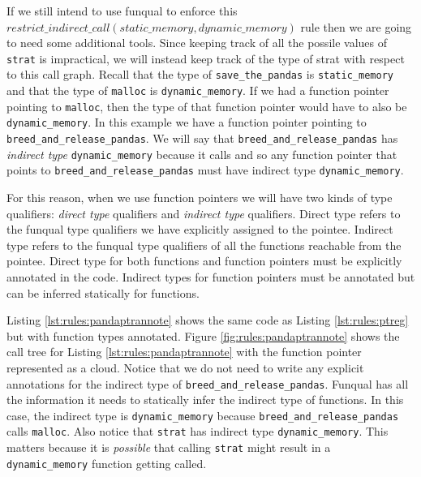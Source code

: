 \begin{sloppypar}
If we still intend to use funqual to enforce this $restrict\_indirect\_call(static\_memory, dynamic\_memory)$ rule then we are going to need some additional tools.  Since keeping track of all the possile values of \lstinline{strat} is impractical, we will instead keep track of the type of strat with respect to this call graph.  Recall that the type of \lstinline{save_the_pandas} is \lstinline{static_memory} and that the type of \lstinline{malloc} is \lstinline{dynamic_memory}.  If we had a function pointer pointing to \lstinline{malloc}, then the type of that function pointer would have to also be \lstinline{dynamic_memory}.  In this example we have a function pointer pointing to \lstinline{breed_and_release_pandas}.  We will say that \lstinline{breed_and_release_pandas} has \textit{indirect type} \lstinline{dynamic_memory} because it calls  and so any function pointer that points to \lstinline{breed_and_release_pandas} must have indirect type \lstinline{dynamic_memory}.
\end{sloppypar}

For this reason, when we use function pointers we will have two kinds of type qualifiers:  \textit{direct type} qualifiers and \textit{indirect type} qualifiers.  Direct type refers to the funqual type qualifiers we have explicitly assigned to the pointee.  Indirect type refers to the funqual type qualifiers of all the functions reachable from the pointee.  Direct type for both functions and function pointers must be explicitly annotated in the code.  Indirect types for function pointers must be annotated but can be inferred statically for functions. 

Listing \ref{lst:rules:pandaptrannote} shows the same code as Listing \ref{lst:rules:ptreg} but with function types annotated.  Figure \ref{fig:rules:pandaptrannote} shows the call tree for Listing \ref{lst:rules:pandaptrannote} with the function pointer represented as a cloud.  Notice that we do not need to write any explicit annotations for the indirect type of \lstinline{breed_and_release_pandas}.  Funqual has all the information it needs to statically infer the indirect type of functions.  In this case, the indirect type is \lstinline{dynamic_memory} because \lstinline{breed_and_release_pandas} calls \lstinline{malloc}.  Also notice that \lstinline{strat} has indirect type \lstinline{dynamic_memory}.  This matters because it is \textit{possible} that calling \lstinline{strat} might result in a \lstinline{dynamic_memory} function getting called.  

